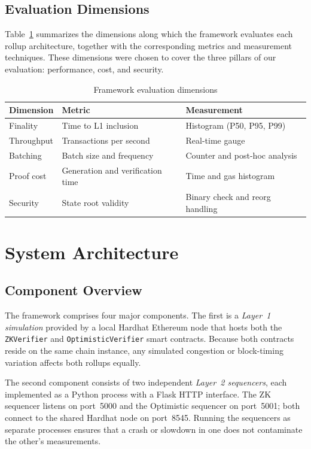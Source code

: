 \subsection{Evaluation Dimensions}

Table~\ref{tab:eval-dimensions} summarizes the dimensions along which the framework evaluates each rollup architecture, together with the corresponding metrics and measurement techniques. These dimensions were chosen to cover the three pillars of our evaluation: performance, cost, and security.

\begin{table}[h]
    \centering
    \begin{tabular}{l|l|l}
        \hline
        \textbf{Dimension} & \textbf{Metric} & \textbf{Measurement} \\
        \hline
        Finality & Time to L1 inclusion & Histogram (P50, P95, P99) \\
        \hline
        Throughput & Transactions per second & Real-time gauge \\
        \hline
        Batching & Batch size and frequency & Counter and post-hoc analysis \\
        \hline
        Proof cost & Generation and verification time & Time and gas histogram \\
        \hline
        Security & State root validity & Binary check and reorg handling \\
        \hline
    \end{tabular}
    \caption{Framework evaluation dimensions}
    \label{tab:eval-dimensions}
\end{table}

\section{System Architecture}

\subsection{Component Overview}

The framework comprises four major components. The first is a \textit{Layer~1 simulation} provided by a local Hardhat Ethereum node that hosts both the \texttt{ZKVerifier} and \texttt{OptimisticVerifier} smart contracts. Because both contracts reside on the same chain instance, any simulated congestion or block-timing variation affects both rollups equally.

The second component consists of two independent \textit{Layer~2 sequencers}, each implemented as a Python process with a Flask HTTP interface. The ZK sequencer listens on port~5000 and the Optimistic sequencer on port~5001; both connect to the shared Hardhat node on port~8545. Running the sequencers as separate processes ensures that a crash or slowdown in one does not contaminate the other's measurements.

